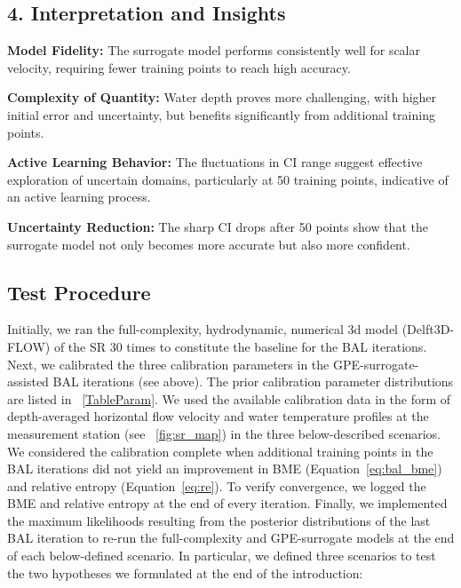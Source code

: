\documentclass[draft,linenumbers,onecolumn]{agujournal2019} %
\begin{document}
\subsection*{4. Interpretation and Insights}

\textbf{Model Fidelity:} The surrogate model performs consistently well for scalar velocity, requiring fewer training points to reach high accuracy.

\textbf{Complexity of Quantity:} Water depth proves more challenging, with higher initial error and uncertainty, but benefits significantly from additional training points.

\textbf{Active Learning Behavior:} The fluctuations in CI range suggest effective exploration of uncertain domains, particularly at 50 training points, indicative of an active learning process.

\textbf{Uncertainty Reduction:} The sharp CI drops after 50 points show that the surrogate model not only becomes more accurate but also more confident.




\subsection{Test Procedure}
\label{sec:test-proc}

Initially, we ran the full-complexity, hydrodynamic, numerical 3d model (Delft3D-FLOW) of the SR 30 times to constitute the baseline for the BAL iterations. Next, we calibrated the three calibration parameters in the GPE-surrogate-assisted BAL iterations (see above). The prior calibration parameter distributions are listed in \tablename{~\ref{TableParam}}.
We used the available calibration data in the form of depth-averaged horizontal flow velocity and water temperature profiles at the measurement station (see \figurename{~\ref{fig:sr_map}}) in the three below-described scenarios. We considered the calibration complete when additional training points in the BAL iterations did not yield an improvement in BME (Equation~\ref{eq:bal_bme}) and relative entropy (Equation~\ref{eq:re}). To verify convergence, we logged the BME and relative entropy at the end of every iteration. Finally, we implemented the maximum likelihoods resulting from the posterior distributions of the last BAL iteration to re-run the full-complexity and GPE-surrogate models at the end of each below-defined scenario. In particular, we defined three scenarios to test the two hypotheses we formulated at the end of the introduction: 
\end{document}

